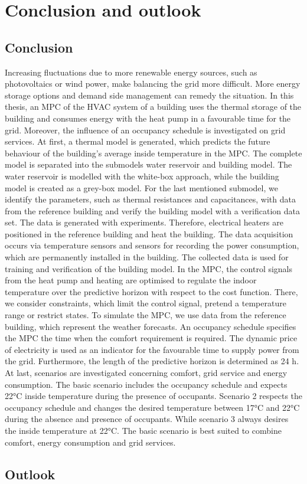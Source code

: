 \chapter{Conclusion and outlook}
\label{ch:Conclusionandoutlook}

\section{Conclusion}
\label{sec:conclusion}
Increasing fluctuations due to more renewable energy sources, such as photovoltaics or wind power, make balancing the grid more difficult. More energy storage options and demand side management can remedy the situation. In this thesis, an MPC of the HVAC system of a building uses the thermal storage of the building and consumes energy with the heat pump in a favourable time for the grid. Moreover, the influence of an occupancy schedule is investigated on grid services.\newline
At first, a thermal model is generated, which predicts the future behaviour of the building's average inside temperature in the MPC. The complete model is separated into the submodels water reservoir and building model. The water reservoir is modelled with the white-box approach, while the building model is created as a grey-box model. For the last mentioned submodel, we identify the parameters, such as thermal resistances and capacitances, with data from the reference building and verify the building model with a verification data set. The data is generated with experiments. Therefore, electrical heaters are positioned in the reference building and heat the building. The data acquisition occurs via temperature sensors and sensors for recording the power consumption, which are permanently installed in the building. The collected data is used for training and verification of the building model. \newline
In the MPC, the control signals from the heat pump and heating are optimised to regulate the indoor temperature over the predictive horizon with respect to the cost function. There, we consider constraints, which limit the control signal, pretend a temperature range or restrict states. To simulate the MPC, we use data from the reference building, which represent the weather forecasts. An occupancy schedule specifies the MPC the time when the comfort requirement is required. The dynamic price of electricity is used as an indicator for the favourable time to supply power from the grid. Furthermore, the length of the predictive horizon is determined as 24 h.\newline
At last, scenarios are investigated concerning comfort, grid service and energy consumption. The basic scenario includes the occupancy schedule and expects 22°C inside temperature during the presence of occupants. Scenario 2 respects the occupancy schedule and changes the desired temperature between 17°C and 22°C during the absence and presence of occupants. While scenario 3 always desires the inside temperature at 22°C. The basic scenario is best suited to combine comfort, energy consumption and grid services.\newline

\section{Outlook}
\label{sec:outlook}
%
